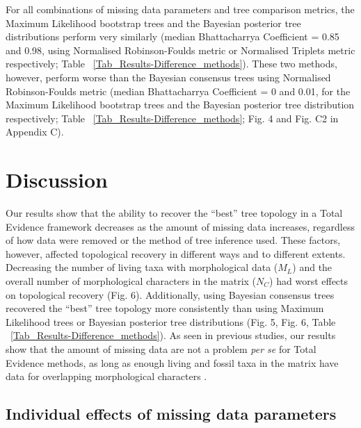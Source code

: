 \documentclass[12pt,letterpaper]{article}
\begin{document}
For all combinations of missing data parameters and tree comparison metrics, the Maximum Likelihood bootstrap trees and the Bayesian posterior tree distributions perform very similarly (median Bhattacharrya Coefficient = 0.85 and 0.98, using Normalised Robinson-Foulds metric or Normalised Triplets metric respectively; Table ~\ref{Tab_Results-Difference_methods}).
These two methods, however, perform worse than the Bayesian consensus trees using Normalised Robinson-Foulds metric (median Bhattacharrya Coefficient = 0 and 0.01, for the Maximum Likelihood bootstrap trees and the Bayesian posterior tree distribution respectively; Table ~\ref{Tab_Results-Difference_methods}; Fig. 4 and Fig. C2 in Appendix C).

%
%


\section{Discussion}

Our results show that the ability to recover the ``best'' tree topology in a Total Evidence framework decreases as the amount of missing data increases, regardless of how data were removed or the method of tree inference used.
These factors, however, affected topological recovery in different ways and to different extents.
Decreasing the number of living taxa with morphological data ($M_{L}$) and the overall number of morphological characters in the matrix ($N_{C}$) had worst effects on topological recovery (Fig. 6).
Additionally, using Bayesian consensus trees recovered the ``best'' tree topology more consistently than using Maximum Likelihood trees or Bayesian posterior tree distributions (Fig. 5, Fig. 6, Table ~\ref{Tab_Results-Difference_methods}).
As seen in previous studies, our results show that the amount of missing data are not a problem \textit{per se} for Total Evidence methods, as long as enough living and fossil taxa in the matrix have data for overlapping morphological characters \citep[e.g.][]{kearneyfragmentary2002,wiensmissing2003,rouresite-specific2011,pattinsonphylogeny2014}.

\subsection{Individual effects of missing data parameters}
\end{document}
